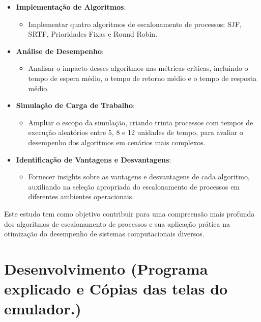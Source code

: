 \documentclass[
	12pt,				%
	openright,			%
	oneside,			%
	a4paper,			%
	chapter=TITLE,		%
	english,			%
	french,				%
	spanish,			%
	brazil				%
	]{abntex2}
\theoremstyle{definition}
\begin{document}
\begin{itemize}
    \item \textbf{Implementação de Algoritmos}:
    \begin{itemize}
        \item Implementar quatro algoritmos de escalonamento de processos: SJF, SRTF, Prioridades Fixas e Round Robin.
    \end{itemize}
    
    \item \textbf{Análise de Desempenho}:
    \begin{itemize}
        \item Analisar o impacto desses algoritmos nas métricas críticas, incluindo o tempo de espera médio, o tempo de retorno médio e o tempo de resposta médio.
    \end{itemize}
    
    \item \textbf{Simulação de Carga de Trabalho}:
    \begin{itemize}
        \item Ampliar o escopo da simulação, criando trinta processos com tempos de execução aleatórios entre 5, 8 e 12 unidades de tempo, para avaliar o desempenho dos algoritmos em cenários mais complexos.
    \end{itemize}
    
    \item \textbf{Identificação de Vantagens e Desvantagens}:
    \begin{itemize}
        \item Fornecer insights sobre as vantagens e desvantagens de cada algoritmo, auxiliando na seleção apropriada do escalonamento de processos em diferentes ambientes operacionais.
    \end{itemize}
\end{itemize}


Este estudo tem como objetivo contribuir para uma compreensão mais profunda dos algoritmos de escalonamento de processos e sua aplicação prática na otimização do desempenho de sistemas computacionais diversos.
  

\chapter{Desenvolvimento (Programa explicado e Cópias das telas do emulador.)}
\end{document}
